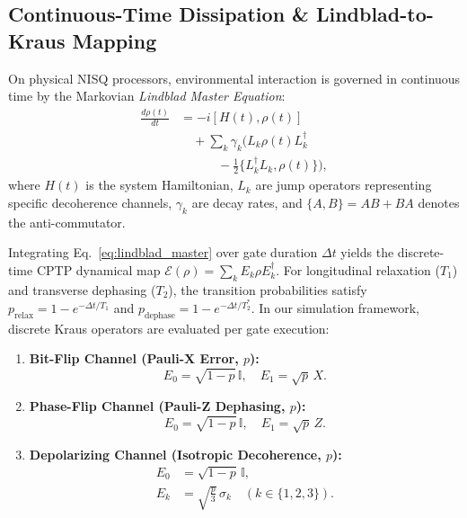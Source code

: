 \documentclass[pdflatex,sn-mathphys-num]{sn-jnl}%
\theoremstyle{thmstyleone}%
\theoremstyle{thmstyletwo}%
\theoremstyle{thmstylethree}%
\begin{document}
\subsection{Continuous-Time Dissipation \& Lindblad-to-Kraus Mapping}
On physical NISQ processors, environmental interaction is governed in continuous time by the Markovian \textit{Lindblad Master Equation}:
\begin{align}
\frac{d\rho(t)}{dt} &= -i [H(t), \rho(t)] \nonumber \\
&\quad + \sum_{k} \gamma_k \Big( L_k \rho(t) L_k^\dagger \nonumber \\
&\qquad\quad - \frac{1}{2} \{L_k^\dagger L_k, \rho(t)\} \Big),
\label{eq:lindblad_master}
\end{align}
where $H(t)$ is the system Hamiltonian, $L_k$ are jump operators representing specific decoherence channels, $\gamma_k$ are decay rates, and $\{A, B\} = AB + BA$ denotes the anti-commutator.

Integrating Eq.~\eqref{eq:lindblad_master} over gate duration $\Delta t$ yields the discrete-time CPTP dynamical map $\mathcal{E}(\rho) = \sum_k E_k \rho E_k^\dagger$. For longitudinal relaxation ($T_1$) and transverse dephasing ($T_2$), the transition probabilities satisfy $p_{\mathrm{relax}} = 1 - e^{-\Delta t / T_1}$ and $p_{\mathrm{dephase}} = 1 - e^{-\Delta t / T_2^*}$. In our simulation framework, discrete Kraus operators are evaluated per gate execution:
\begin{enumerate}
    \item \textbf{Bit-Flip Channel (Pauli-X Error, $p$):}
    \begin{equation}
    E_0 = \sqrt{1 - p} \, \mathbb{I}, \quad E_1 = \sqrt{p} \, X.
    \label{eq:kraus_bitflip}
    \end{equation}
    \item \textbf{Phase-Flip Channel (Pauli-Z Dephasing, $p$):}
    \begin{equation}
    E_0 = \sqrt{1 - p} \, \mathbb{I}, \quad E_1 = \sqrt{p} \, Z.
    \label{eq:kraus_phaseflip}
    \end{equation}
    \item \textbf{Depolarizing Channel (Isotropic Decoherence, $p$):}
    \begin{align}
    E_0 &= \sqrt{1 - p} \, \mathbb{I}, \nonumber \\
    E_k &= \sqrt{\frac{p}{3}} \, \sigma_k \quad (k \in \{1, 2, 3\}).
    \label{eq:kraus_depolarizing}
    \end{align}
\end{enumerate}
\end{document}
